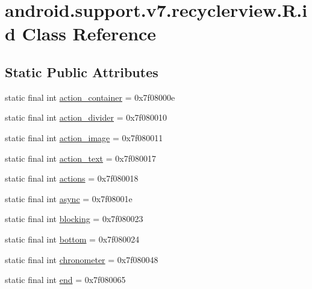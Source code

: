 \hypertarget{classandroid_1_1support_1_1v7_1_1recyclerview_1_1_r_1_1id}{}\section{android.\+support.\+v7.\+recyclerview.\+R.\+id Class Reference}
\label{classandroid_1_1support_1_1v7_1_1recyclerview_1_1_r_1_1id}
\subsection*{Static Public Attributes}
\begin{DoxyCompactItemize}
\item 
static final int \mbox{\hyperlink{classandroid_1_1support_1_1v7_1_1recyclerview_1_1_r_1_1id_a98a2b7ea76095687895566393269cfd3}{action\+\_\+container}} = 0x7f08000e
\item 
static final int \mbox{\hyperlink{classandroid_1_1support_1_1v7_1_1recyclerview_1_1_r_1_1id_a354e0bf2908e96cfc50a29d5ce3f4f72}{action\+\_\+divider}} = 0x7f080010
\item 
static final int \mbox{\hyperlink{classandroid_1_1support_1_1v7_1_1recyclerview_1_1_r_1_1id_a71f35fde98329ca524926b0644e02a39}{action\+\_\+image}} = 0x7f080011
\item 
static final int \mbox{\hyperlink{classandroid_1_1support_1_1v7_1_1recyclerview_1_1_r_1_1id_ac9d2ac0852b01922c9dab1db9ade8b94}{action\+\_\+text}} = 0x7f080017
\item 
static final int \mbox{\hyperlink{classandroid_1_1support_1_1v7_1_1recyclerview_1_1_r_1_1id_a67f1e1a5bbb0aac475662be50905c01e}{actions}} = 0x7f080018
\item 
static final int \mbox{\hyperlink{classandroid_1_1support_1_1v7_1_1recyclerview_1_1_r_1_1id_aba31688e330c70179c23baf171031cc9}{async}} = 0x7f08001e
\item 
static final int \mbox{\hyperlink{classandroid_1_1support_1_1v7_1_1recyclerview_1_1_r_1_1id_a696dbf3e7b2a019f9bcb9bf3e3ec2e55}{blocking}} = 0x7f080023
\item 
static final int \mbox{\hyperlink{classandroid_1_1support_1_1v7_1_1recyclerview_1_1_r_1_1id_a1bce7d92a856358ceef47565628a7c93}{bottom}} = 0x7f080024
\item 
static final int \mbox{\hyperlink{classandroid_1_1support_1_1v7_1_1recyclerview_1_1_r_1_1id_a84b100c0a11d127af280351cad812067}{chronometer}} = 0x7f080048
\item 
static final int \mbox{\hyperlink{classandroid_1_1support_1_1v7_1_1recyclerview_1_1_r_1_1id_a2d1e61b70640c92e031e0fb1cfa6712b}{end}} = 0x7f080065

\end{DoxyCompactItemize}
